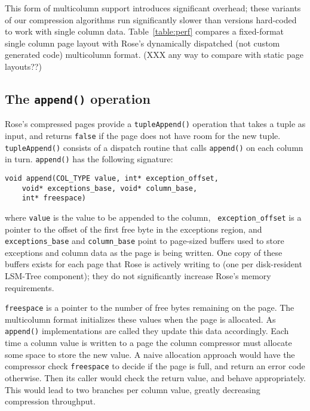 \documentclass{vldb}
\newcommand{\rows}{Rose\xspace}
\newcommand{\rowss}{Rose's\xspace}
\begin{document}
This form of multicolumn support introduces significant overhead;
these variants of our compression algorithms run significantly slower
than versions hard-coded to work with single column data.
Table~\ref{table:perf} compares a fixed-format single column page
layout with \rowss dynamically dispatched (not custom generated code)
multicolumn format. (XXX any way to compare with static page layouts??)


\subsection{The {\tt \large append()} operation}

\rowss compressed pages provide a {\tt tupleAppend()} operation that
takes a tuple as input, and returns {\tt false} if the page does not have
room for the new tuple.  {\tt tupleAppend()} consists of a dispatch
routine that calls {\tt append()} on each column in turn.
{\tt append()} has the
following signature:
\begin{verbatim}
void append(COL_TYPE value, int* exception_offset,
    void* exceptions_base, void* column_base,
    int* freespace)
\end{verbatim}
where {\tt value} is the value to be appended to the column, {\tt
  exception\_offset} is a pointer to the offset of the first free byte in the
exceptions region, and {\tt exceptions\_base} and {\tt column\_base} point
to page-sized buffers used to store exceptions and column data as
the page is being written.  One copy of these buffers exists for
each page that \rows is actively writing to (one per disk-resident
LSM-Tree component); they do not significantly increase \rowss memory
requirements.

{\tt freespace} is a pointer to the number of free bytes
remaining on the page.  The multicolumn format initializes these
values when the page is allocated.  As {\tt append()} implementations
are called they update this data accordingly.  Each time a column
value is written to a page the column compressor must allocate some
space to store the new value.  A naive allocation approach would have
the compressor check {\tt freespace} to decide if the page is full,
and return an error code otherwise.  Then its caller would check the
return value, and behave appropriately.  This would lead to two branches
per column value, greatly decreasing compression throughput.
\end{document}
